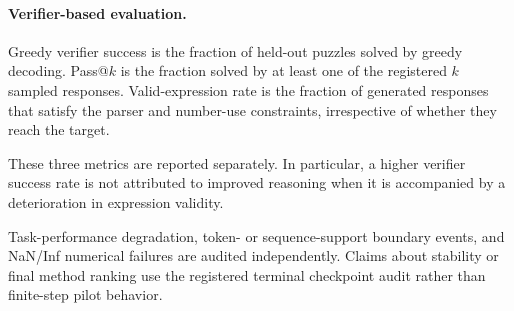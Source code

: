 \paragraph{Verifier-based evaluation.}

Greedy verifier success is the fraction of held-out puzzles solved by
greedy decoding. Pass@\(k\) is the fraction solved by at least one of
the registered \(k\) sampled responses. Valid-expression rate is the
fraction of generated responses that satisfy the parser and number-use
constraints, irrespective of whether they reach the target.

These three metrics are reported separately. In particular, a higher
verifier success rate is not attributed to improved reasoning when it
is accompanied by a deterioration in expression validity.

Task-performance degradation, token- or sequence-support boundary
events, and NaN/Inf numerical failures are audited independently.
Claims about stability or final method ranking use the registered
terminal checkpoint audit rather than finite-step pilot behavior.

